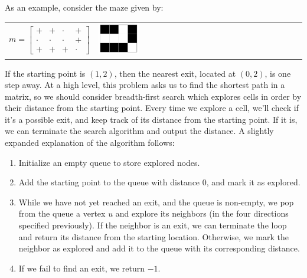 \documentclass[11pt]{article}
\begin{document}
As an example, consider the maze given by:
\begin{center}
    \begin{tabular}{C{0.3\textwidth}C{0.3\textwidth}}
        $m = \begin{bmatrix}
            + & + & \cdot & + \\
            \cdot & \cdot & \cdot & + \\
            + & + & + & \cdot 
        \end{bmatrix}$ & 
        \includegraphics[width=0.2\textwidth, valign=m]{figures/maze.png}
    \end{tabular}
\end{center}

If the starting point is $(1, 2)$, then the nearest exit, located at $(0, 2)$, is one step away. At a high level, this problem asks us to find the shortest path in a matrix, so we should consider breadth-first search which explores cells in order by their distance from the starting point. Every time we explore a cell, we'll check if it's a possible exit, and keep track of its distance from the starting point. If it is, we can terminate the search algorithm and output the distance. A slightly expanded explanation of the algorithm follows:
\begin{enumerate}
    \item Initialize an empty queue to store explored nodes. 
    \item Add the starting point to the queue with distance 0, and mark it as explored. 
    \item While we have not yet reached an exit, and the queue is non-empty, we pop from the queue a vertex $u$ and explore its neighbors (in the four directions specified previously). If the neighbor is an exit, we can terminate the loop and return its distance from the starting location. Otherwise, we mark the neighbor as explored and add it to the queue with its corresponding distance. 
    \item If we fail to find an exit, we return $-1$. 
\end{enumerate}
\end{document}
